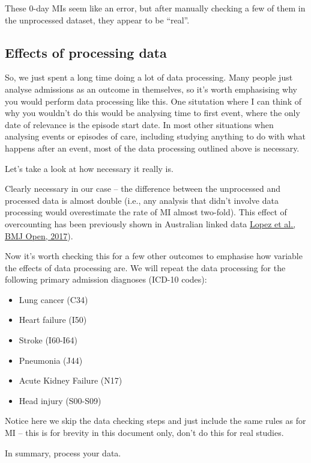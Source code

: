 \documentclass[11pt]{article}
\begin{document}
\begin{stlog}\end{stlog}
\color{black}

These 0-day MIs seem like an error, but after manually checking a few
of them in the unprocessed dataset, they appear to be ``real''. 

\subsection{Effects of processing data}

So, we just spent a long time doing a lot of data processing. 
Many people just analyse admissions as an outcome in themselves, 
so it's worth emphasising why you would perform data processing like this. 
One situtation where I can think of why you wouldn't do this would be analysing time
to first event, where the only date of relevance is the episode start date. 
In most other situations when analysing events or episodes of care, 
including studying anything to do with what happens
after an event, most of the data processing outlined above is necessary. 

Let's take a look at how necessary it really is.

\color{Blue4}
\begin{stlog}\end{stlog}
\color{black}

Clearly necessary in our case -- the difference between the unprocessed and processed data
is almost double (i.e., any analysis that didn't involve data processing would
overestimate the rate of MI almost two-fold). This effect of overcounting
has been previously shown in Australian linked data \color{blue}
\href{https://bmjopen.bmj.com/content/7/11/e019226}{Lopez et al., BMJ Open, 2017}\color{black}).


Now it's worth checking this for 
a few other outcomes to emphasise how variable the effects of data processing are.
We will repeat the data processing for the following primary admission diagnoses (ICD-10 codes):
\begin{itemize}
\item Lung cancer (C34)
\item Heart failure (I50)
\item Stroke (I60-I64)
\item Pneumonia (J44)
\item Acute Kidney Failure (N17)
\item Head injury (S00-S09)
\end{itemize}

Notice here we skip the data checking steps and just include the same rules as for MI
 -- this is for brevity in this document only, don't do this for real studies. 

\color{Blue4}
\begin{stlog}\end{stlog}
\begin{stlog}\end{stlog}
\color{black}

In summary, process your data. 
\end{document}
